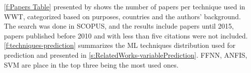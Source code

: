 \autoref{f:Papers Table} presented by \cite{Corominas2018} shows the number of papers per technique used in \ac{WWT}, categorized based on purposes, countries and the authors' background. The search was done in SCOPUS, and the results include papers until 2015, papers published before 2010 and with less than five citations were not included. \autoref{f:techniques-prediction} summarizes the \ac{ML} techniques distribution used for prediction and presented in \autoref{s:RelatedWorks-variablePrediction}. \ac{FFNN}, \ac{ANFIS}, \ac{SVM} are place in the top three being the most used ones.
